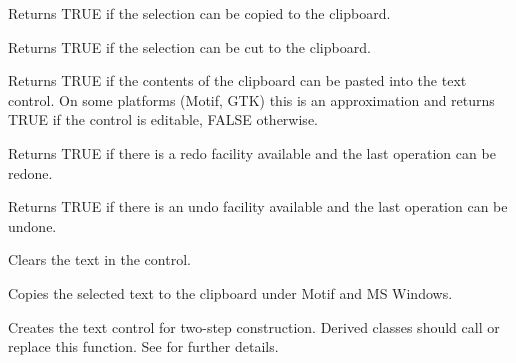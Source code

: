 \label{wxtextctrlcancopy}


Returns TRUE if the selection can be copied to the clipboard.

\label{wxtextctrlcancut}


Returns TRUE if the selection can be cut to the clipboard.

\label{wxtextctrlcanpaste}


Returns TRUE if the contents of the clipboard can be pasted into the
text control. On some platforms (Motif, GTK) this is an approximation
and returns TRUE if the control is editable, FALSE otherwise.

\label{wxtextctrlcanredo}


Returns TRUE if there is a redo facility available and the last operation
can be redone.

\label{wxtextctrlcanundo}


Returns TRUE if there is an undo facility available and the last operation
can be undone.

\label{wxtextctrlclear}


Clears the text in the control.

\label{wxtextctrlcopy}


Copies the selected text to the clipboard under Motif and MS Windows.

\label{wxtextctrlcreate}


Creates the text control for two-step construction. Derived classes
should call or replace this function. See \rtfsp
for further details.

